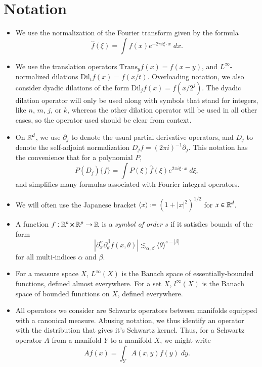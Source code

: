
\chapter*{Notation}

\begin{itemize}
    \item We use the normalization of the Fourier transform given by the formula
    \[ \widehat{f}(\xi) = \int f(x) e^{- 2 \pi i \xi \cdot x}\; dx. \]

    \item We use the translation operators $\text{Trans}_y f(x) = f(x - y)$, and $L^\infty$-normalized dilations $\text{Dil}_t f(x) = f(x/t)$. Overloading notation, we also consider dyadic dilations of the form $\text{Dil}_j f(x) = f(x/2^j)$. The dyadic dilation operator will only be used along with symbols that stand for integers, like $n$, $m$, $j$, or $k$, whereas the other dilation operator will be used in all other cases, so the operator used should be clear from context.

    \item On $\operatorname{\mathbb{R}}^d$, we use $\partial_j$ to denote the usual partial derivative operators, and $D_j$ to denote the self-adjoint normalization $D_j f = (2 \pi i)^{-1} \partial_j$. This notation has the convenience that for a polynomial $P$,
    \[ P(D_j) \{ f \} = \int P(\xi) \widehat{f}(\xi) e^{2 \pi i \xi \cdot x}\; d\xi, \]
    and simplifies many formulas associated with Fourier integral operators.

    \item We will often use the Japanese bracket $\langle x \rangle \coloneqq (1 + |x|^2)^{1/2}$ for $x \in \operatorname{\mathbb{R}}^d$.

    \item A function $f: \operatorname{\mathbb{R}}^n \times \operatorname{\mathbb{R}}^p \to \operatorname{\mathbb{R}}$ is a \emph{symbol of order $s$} if it satisfies bounds of the form
    \[ | \partial_x^\alpha \partial_\theta^\beta f (x,\theta) | \lesssim_{\alpha,\beta} \langle \theta \rangle^{s - |\beta|} \]
    for all multi-indices $\alpha$ and $\beta$.

    \item For a measure space $X$, $L^\infty(X)$ is the Banach space of essentially-bounded functions, defined almost everywhere. For a set $X$, $l^\infty(X)$ is the Banach space of bounded functions on $X$, defined everywhere.

    \item All operators we consider are Schwartz operators between manifolds equipped with a canonical measure. Abusing notation, we thus identify an operator with the distribution that gives it's Schwartz kernel. Thus, for a Schwartz operator $A$ from a manifold $Y$ to a manifold $X$, we might write
    \[ A f(x) = \int_Y A(x,y) f(y)\; dy. \]

\end{itemize}